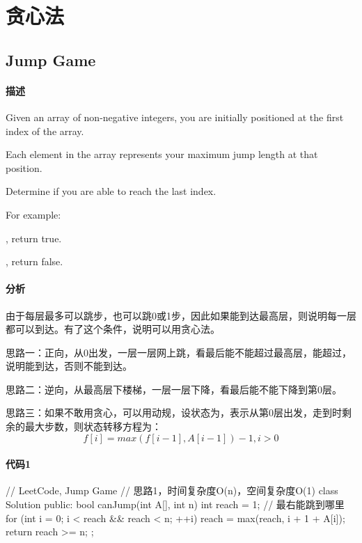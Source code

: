 \chapter{贪心法}


\section{Jump Game} %
\label{sec:jump-game}


\subsubsection{描述}
Given an array of non-negative integers, you are initially positioned at the first index of the array.

Each element in the array represents your maximum jump length at that position.

Determine if you are able to reach the last index.

For example:

, return true.

, return false.


\subsubsection{分析}
由于每层最多可以跳步，也可以跳0或1步，因此如果能到达最高层，则说明每一层都可以到达。有了这个条件，说明可以用贪心法。

思路一：正向，从0出发，一层一层网上跳，看最后能不能超过最高层，能超过，说明能到达，否则不能到达。

思路二：逆向，从最高层下楼梯，一层一层下降，看最后能不能下降到第0层。

思路三：如果不敢用贪心，可以用动规，设状态为，表示从第0层出发，走到时剩余的最大步数，则状态转移方程为：
$$
f[i] = max(f[i-1], A[i-1])-1, i > 0
$$


\subsubsection{代码1}
\begin{Code}
// LeetCode, Jump Game
// 思路1，时间复杂度O(n)，空间复杂度O(1)
class Solution {
public:
    bool canJump(int A[], int n) {
        int reach = 1; // 最右能跳到哪里
        for (int i = 0; i < reach && reach < n; ++i)
            reach = max(reach,  i + 1 + A[i]);
        return reach >= n;
    }
};
\end{Code}


